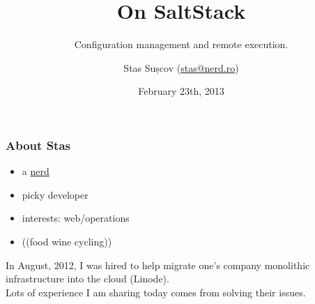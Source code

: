 \documentclass[compress]{beamer}
\title{On SaltStack}
\subtitle{Configuration management and remote execution.}
\author{Stas Sușcov (\href{mailto:stas@nerd.ro}{stas@nerd.ro})}
\date{February 23th, 2013}
\institute{GeekMeet \#15, Cluj-Napoca, Transylvania}
\begin{document}
\maketitle

\begin{frame}
\frametitle{About Stas}

\begin{itemize}
  \item a \href{http://stas.nerd.ro}{nerd}
  \item picky developer
  \item interests: web/operations
  \item (\Heart (food wine cycling))
\end{itemize}
\end{frame}

\begin{frame}
  \begin{center}
    \huge In August, 2012, I was hired to help migrate one's company monolithic
    infrastructure into the cloud (Linode).
    \\
    \small Lots of experience I am sharing today comes from solving their issues.
  \end{center}
\end{frame}
\end{document}
